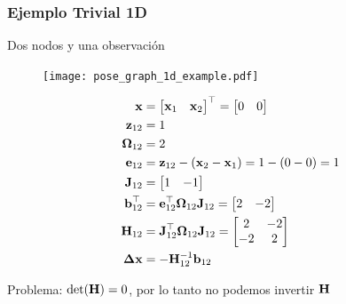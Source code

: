 \begin{frame}
    \frametitle{Ejemplo Trivial 1D}
    
    Dos nodos y una observación

     \begin{figure}[!h]
        \texttt{[image: pose\_graph\_1d\_example.pdf]}
    \end{figure}

    \small

    \begin{align*}
        \boldsymbol{\mathbf{x}} &=
        \begin{bmatrix}
            \boldsymbol{\mathbf{x}}_{1} & \boldsymbol{\mathbf{x}}_{2}
        \end{bmatrix}^{\top}
        =
        \begin{bmatrix}
            0 & 0
        \end{bmatrix}\\
        \boldsymbol{\mathbf{z}}_{12} &= 1\\
        \boldsymbol{\mathbf{\Omega}}_{12} &= 2\\
        \boldsymbol{\mathbf{e}}_{12} &= \boldsymbol{\mathbf{z}}_{12} - (\boldsymbol{\mathbf{x}}_{2} - \boldsymbol{\mathbf{x}}_{1}) = 1 - (0 - 0) = 1\\
        \boldsymbol{\mathbf{J}}_{12} &=
        \begin{bmatrix}
            1 & -1
        \end{bmatrix}\\
        \boldsymbol{\mathbf{b}}_{12}^{\top} &= \boldsymbol{\mathbf{e}}_{12}^{\top} \boldsymbol{\mathbf{\Omega}}_{12} \boldsymbol{\mathbf{J}}_{12} =
        \begin{bmatrix}
            2 & -2
        \end{bmatrix}\\
        \boldsymbol{\mathbf{H}}_{12} &= \boldsymbol{\mathbf{J}}_{12}^{\top} \boldsymbol{\mathbf{\Omega}}_{12} \boldsymbol{\mathbf{J}}_{12} = 
        \begin{bmatrix}
            2 & -2\\
            -2 & 2
        \end{bmatrix}\\
    \boldsymbol{\mathbf{\Delta}}\boldsymbol{\mathbf{x}} &= -{\boldsymbol{\mathbf{H}}}^{-1}_{12} \boldsymbol{\mathbf{b}}_{12}\\
    \end{align*}

    \begin{center}
    \alert{Problema:} $\det(\boldsymbol{\mathbf{H}}) = 0$, por lo tanto no podemos invertir $\boldsymbol{\mathbf{H}}$
    \end{center}
\end{frame}

